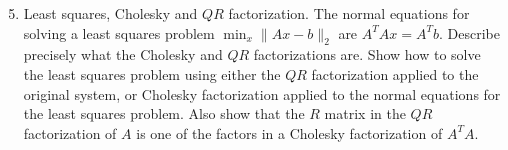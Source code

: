 \documentclass[10pt]{article}
\begin{document}
\begin{enumerate}
  \setcounter{enumi}{4}
  \item Least squares, Cholesky and $Q R$ factorization. The normal equations for solving a least squares problem $\min _{x}\|A x-b\|_{2}$ are $A^{T} A x=A^{T} b$. Describe precisely what the Cholesky and $Q R$ factorizations are. Show how to solve the least squares problem using either the $Q R$ factorization applied to the original system, or Cholesky factorization applied to the normal equations for the least squares problem. Also show that the $R$ matrix in the $Q R$ factorization of $A$ is one of the factors in a Cholesky factorization of $A^{T} A$.
\end{enumerate}
\end{document}
